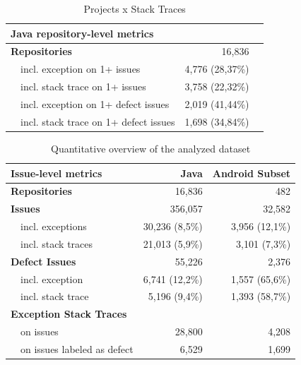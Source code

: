 \documentclass[conference]{IEEEtran}
\begin{document}


\begin{table}
\centering
\begin{tabular}{p{1em}lrr}
\hline
 \multicolumn{2}{l}{\bfseries{Java repository-level metrics}} & \\
\hline
\multicolumn{2}{l}{\bfseries{Repositories}} & 16,836\\
    & incl. exception on 1+ issues & 4,776 (28,37\%) \\
    & incl. stack trace on 1+ issues & 3,758 (22,32\%) \\
    & incl. exception on 1+ defect issues & 2,019 (41,44\%)\\
    & incl. stack trace on 1+ defect issues  & 1,698 (34,84\%) \\

\hline
\end{tabular}
\caption{Projects x Stack Traces}
\label{tab:proj}
\end{table}

\begin{table}
\centering
\begin{tabular}{p{1em}lrr}
\hline
\multicolumn{2}{l}{\bfseries{Issue-level metrics}} & \bfseries{Java} & \bfseries{Android Subset}\\
\hline
   \multicolumn{2}{l}{\bfseries{Repositories}} & 16,836 & 482\\
 \multicolumn{2}{l}{\bfseries{Issues}} & 356,057 & 32,582\\
    & incl. exceptions & 30,236 (8,5\%) & 3,956 (12,1\%) \\
    & incl. stack traces & 21,013 (5,9\%) & 3,101 (7,3\%) \\
 \multicolumn{2}{l}{\bfseries{Defect Issues}} & 55,226 & 2,376 \\
    & incl. exception & 6,741 (12,2\%) & 1,557 (65,6\%) \\
    & incl. stack trace &  5,196 (9,4\%) & 1,393 (58,7\%)\\
\multicolumn{2}{l}{\bfseries{Exception Stack Traces}} &  & \\
    & on issues  & 28,800 & 4,208  \\
    & on issues labeled as defect & 6,529 & 1,699 \\
\hline
\end{tabular}
\caption{Quantitative overview of the analyzed dataset}
\label{tab:overview}
\end{table}
\end{document}
